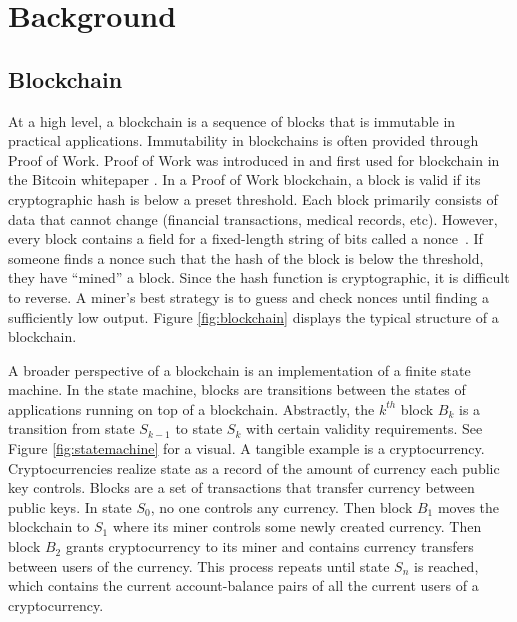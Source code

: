 \section{Background}
\label{sec:background}

\subsection{Blockchain}

At a high level, a blockchain is a sequence of blocks that is immutable in practical applications.
Immutability in blockchains is often provided through Proof of Work.
Proof of Work was introduced in \cite{dwork1992PoW} and first used for blockchain in the Bitcoin whitepaper \cite{nakamoto2009Bitcoin}.
In a Proof of Work blockchain, a block is valid if its cryptographic hash is below a preset threshold.
Each block primarily consists of data that cannot change (financial transactions, medical records, etc).
However, every block contains a field for a fixed-length string of bits called a nonce~\cite{nakamoto2009Bitcoin}.
If someone finds a nonce such that the hash of the block is below the threshold, they have ``mined'' a block.
Since the hash function is cryptographic, it is difficult to reverse.
A miner's best strategy is to guess and check nonces until finding a sufficiently low output.
Figure \ref{fig:blockchain} displays the typical structure of a blockchain.



A broader perspective of a blockchain is an implementation of a finite state machine.
In the state machine, blocks are transitions between the states of applications running on top of a blockchain.
Abstractly, the $k^{th}$ block $B_k$ is a transition from state $S_{k-1}$ to state $S_k$ with certain validity requirements.
See Figure \ref{fig:statemachine} for a visual.
A tangible example is a cryptocurrency.
Cryptocurrencies realize state as a record of the amount of currency each public key controls.
Blocks are a set of transactions that transfer currency between public keys.
In state $S_0$, no one controls any currency.
Then block $B_1$ moves the blockchain to $S_1$ where its miner controls some newly created currency.
Then block $B_2$ grants cryptocurrency to its miner and contains currency transfers between users of the currency.
This process repeats until state $S_n$ is reached, which contains the current account-balance pairs of all the current users of a cryptocurrency.



